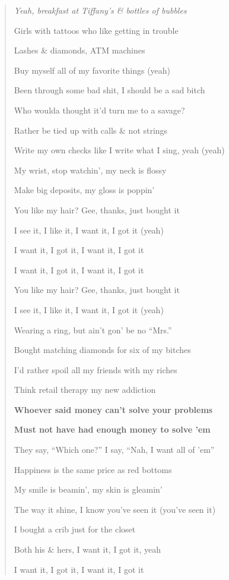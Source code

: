 \documentclass{article}
\begin{document}
\begin{enumerate}
	\begin{quotation}\it
		Yeah, breakfast at Tiffany's \& bottles of bubbles

		Girls with tattoos who like getting in trouble

		Lashes \& diamonds, ATM machines

		Buy myself all of my favorite things (yeah)

		Been through some bad shit, I should be a sad bitch

		Who woulda thought it'd turn me to a savage?

		Rather be tied up with calls \& not strings

		Write my own checks like I write what I sing, yeah (yeah)

		My wrist, stop watchin', my neck is flossy

		Make big deposits, my gloss is poppin'

		You like my hair? Gee, thanks, just bought it

		I see it, I like it, I want it, I got it (yeah)

		I want it, I got it, I want it, I got it

		I want it, I got it, I want it, I got it

		You like my hair? Gee, thanks, just bought it

		I see it, I like it, I want it, I got it (yeah)

		Wearing a ring, but ain't gon' be no ``Mrs.''

		Bought matching diamonds for six of my bitches

		I'd rather spoil all my friends with my riches

		Think retail therapy my new addiction

		\textbf{Whoever said money can't solve your problems}

		\textbf{Must not have had enough money to solve 'em}

		They say, ``Which one?'' I say, ``Nah, I want all of 'em''

		Happiness is the same price as red bottoms

		My smile is beamin', my skin is gleamin'

		The way it shine, I know you've seen it (you've seen it)

		I bought a crib just for the closet

		Both his \& hers, I want it, I got it, yeah

		I want it, I got it, I want it, I got it


\end{quotation}
\end{enumerate}
\end{document}
